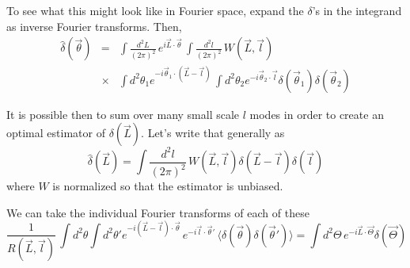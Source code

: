 \documentclass[prd,amsmath,amssymb,floatfix,superscriptaddress,nofootinbib]{revtex4-1}
\def\be{\begin{equation}}
\def\ee{\end{equation}}
\def\bea{\begin{eqnarray}}
\def\eea{\end{eqnarray}}
\newcommand{\vs}{\nonumber\\}
\begin{document}
To see what this might look like in Fourier space, expand the $\delta$'s in the integrand as inverse Fourier transforms. Then,
\bea
\hat \delta(\vec\theta) &=& \int \frac{d^2L}{(2\pi)^2}\, e^{i\vec L\cdot\vec\theta} \, \int \frac{d^2l}{(2\pi)^2}\, W(\vec L, \vec l)
\vs
&\times&\int d^2\theta_1 e^{-i\vec\theta_1\cdot(\vec L - \vec l)} \,
\int d^2\theta_2 e^{-i\vec\theta_2\cdot\vec l} \delta(\vec\theta_1)\delta(\vec\theta_2)
\eea



It is possible then to sum over many small scale $l$ modes in order to create an optimal estimator of $\delta(\vec L)$. Let's write that generally as
\be
\hat\delta(\vec L) = \int \frac{d^2l}{(2\pi)^2}\, W(\vec L, \vec l) \delta(\vec L-\vec l)\delta(\vec l)
\ee
where $W$ is normalized so that the estimator is unbiased.


We can take the individual Fourier transforms of each of these
\be
\frac1{R(\vec L,\vec l)}\, \int d^2\theta \int d^2\theta' e^{-i(\vec L-\vec l)\cdot\vec\theta}\, e^{-i\vec l\cdot\vec\theta'} \, \langle \delta(\vec\theta)\delta(\vec\theta') \rangle
= \int d^2\Theta\, e^{-i\vec L\cdot\vec\Theta} \delta(\vec \Theta)
\ee
\end{document}
